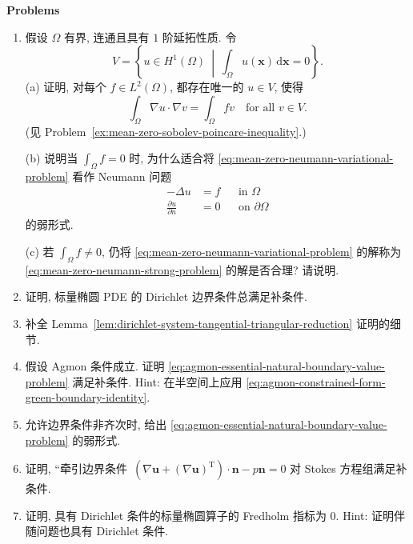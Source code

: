 \textbf{Problems}

\begin{enumerate}[label=\thesection.\arabic*.,ref=\thesection.\arabic*,start=5,series=book-problems]

\item\label{ex:mean-zero-neumann-variational-compatibility} 假设 $\Omega$ 有界, 连通且具有 $1$ 阶延拓性质. 令\[V=\left\{u\in H^1(\Omega)\ \middle|\ \int_\Omega u(\bm{x})\,\mathrm{d}\bm{x}=0\right\}.\](a) 证明, 对每个 $f\in L^2(\Omega)$, 都存在唯一的 $u\in V$, 使得
\begin{equation}\label{eq:mean-zero-neumann-variational-problem}
\int_\Omega\nabla u\cdot\nabla v=\int_\Omega fv\quad\text{for all }v\in V.
\end{equation}
(见 Problem~\ref{ex:mean-zero-sobolev-poincare-inequality}.)

(b) 说明当 $\int_\Omega f=0$ 时, 为什么适合将 \eqref{eq:mean-zero-neumann-variational-problem} 看作 Neumann 问题
\begin{equation}\label{eq:mean-zero-neumann-strong-problem}
\begin{aligned}
-\Delta u&=f&&\text{in }\Omega\\
\frac{\partial u}{\partial n}&=0&&\text{on }\partial\Omega
\end{aligned}
\end{equation}
的弱形式.

(c) 若 $\int_\Omega f\ne0$, 仍将 \eqref{eq:mean-zero-neumann-variational-problem} 的解称为 \eqref{eq:mean-zero-neumann-strong-problem} 的解是否合理? 请说明.

\item\label{ex:scalar-dirichlet-complementing-condition} 证明, 标量椭圆 PDE 的 Dirichlet 边界条件总满足补条件.

\item\label{ex:dirichlet-system-triangular-reduction-details} 补全 Lemma~\ref{lem:dirichlet-system-tangential-triangular-reduction} 证明的细节.

\item\label{ex:agmon-condition-implies-complementing-natural-boundaries} 假设 Agmon 条件成立. 证明 \eqref{eq:agmon-essential-natural-boundary-value-problem} 满足补条件. Hint: 在半空间上应用 \eqref{eq:agmon-constrained-form-green-boundary-identity}.

\item\label{ex:inhomogeneous-essential-natural-boundaries-weak-form} 允许边界条件非齐次时, 给出 \eqref{eq:agmon-essential-natural-boundary-value-problem} 的弱形式.

\item\label{ex:stokes-traction-complementing-condition} 证明, ``牵引边界条件\textquotesingle\textquotesingle\ $(\nabla\bm{u}+(\nabla\bm{u})^{\mathrm{T}})\cdot\bm{n}-p\bm{n}=0$ 对 Stokes 方程组满足补条件.

\item\label{ex:scalar-dirichlet-zero-fredholm-index} 证明, 具有 Dirichlet 条件的标量椭圆算子的 Fredholm 指标为 $0$. Hint: 证明伴随问题也具有 Dirichlet 条件.

\end{enumerate}
